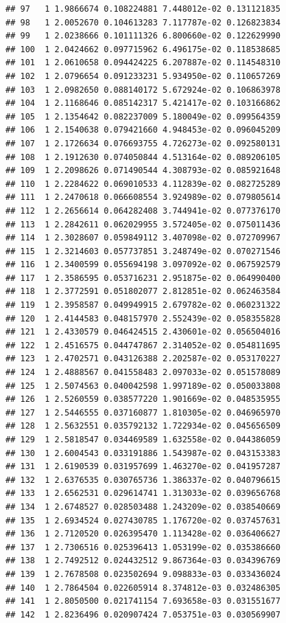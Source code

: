 \documentclass[article]{jss}\usepackage[]{graphicx}\usepackage[]{xcolor}
\makeatletter
\newenvironment{kframe}{%
 \def\at@end@of@kframe{}%
 \ifinner\ifhmode%
  \def\at@end@of@kframe{\end{minipage}}%
  \begin{minipage}{\columnwidth}%
 \fi\fi%
 \def\FrameCommand##1{\hskip\@totalleftmargin \hskip-\fboxsep
 \colorbox{shadecolor}{##1}\hskip-\fboxsep
     \hskip-\linewidth \hskip-\@totalleftmargin \hskip\columnwidth}%
 \MakeFramed {\advance\hsize-\width
   \@totalleftmargin\z@ \linewidth\hsize
   \@setminipage}}%
 {\par\unskip\endMakeFramed%
 \at@end@of@kframe}
\newenvironment{knitrout}{}{} %
\makeatother
\begin{document}
\begin{knitrout}
\begin{kframe}
\begin{verbatim}
## 97   1 1.9866674 0.108224881 7.448012e-02 0.131121835
## 98   1 2.0052670 0.104613283 7.117787e-02 0.126823834
## 99   1 2.0238666 0.101111326 6.800660e-02 0.122629990
## 100  1 2.0424662 0.097715962 6.496175e-02 0.118538685
## 101  1 2.0610658 0.094424225 6.207887e-02 0.114548310
## 102  1 2.0796654 0.091233231 5.934950e-02 0.110657269
## 103  1 2.0982650 0.088140172 5.672924e-02 0.106863978
## 104  1 2.1168646 0.085142317 5.421417e-02 0.103166862
## 105  1 2.1354642 0.082237009 5.180049e-02 0.099564359
## 106  1 2.1540638 0.079421660 4.948453e-02 0.096045209
## 107  1 2.1726634 0.076693755 4.726273e-02 0.092580131
## 108  1 2.1912630 0.074050844 4.513164e-02 0.089206105
## 109  1 2.2098626 0.071490544 4.308793e-02 0.085921648
## 110  1 2.2284622 0.069010533 4.112839e-02 0.082725289
## 111  1 2.2470618 0.066608554 3.924989e-02 0.079805614
## 112  1 2.2656614 0.064282408 3.744941e-02 0.077376170
## 113  1 2.2842611 0.062029955 3.572405e-02 0.075011436
## 114  1 2.3028607 0.059849112 3.407098e-02 0.072709967
## 115  1 2.3214603 0.057737851 3.248749e-02 0.070271546
## 116  1 2.3400599 0.055694198 3.097092e-02 0.067592579
## 117  1 2.3586595 0.053716231 2.951875e-02 0.064990400
## 118  1 2.3772591 0.051802077 2.812851e-02 0.062463584
## 119  1 2.3958587 0.049949915 2.679782e-02 0.060231322
## 120  1 2.4144583 0.048157970 2.552439e-02 0.058355828
## 121  1 2.4330579 0.046424515 2.430601e-02 0.056504016
## 122  1 2.4516575 0.044747867 2.314052e-02 0.054811695
## 123  1 2.4702571 0.043126388 2.202587e-02 0.053170227
## 124  1 2.4888567 0.041558483 2.097033e-02 0.051578089
## 125  1 2.5074563 0.040042598 1.997189e-02 0.050033808
## 126  1 2.5260559 0.038577220 1.901669e-02 0.048535955
## 127  1 2.5446555 0.037160877 1.810305e-02 0.046965970
## 128  1 2.5632551 0.035792132 1.722934e-02 0.045656509
## 129  1 2.5818547 0.034469589 1.632558e-02 0.044386059
## 130  1 2.6004543 0.033191886 1.543987e-02 0.043153383
## 131  1 2.6190539 0.031957699 1.463270e-02 0.041957287
## 132  1 2.6376535 0.030765736 1.386337e-02 0.040796615
## 133  1 2.6562531 0.029614741 1.313033e-02 0.039656768
## 134  1 2.6748527 0.028503488 1.243209e-02 0.038540669
## 135  1 2.6934524 0.027430785 1.176720e-02 0.037457631
## 136  1 2.7120520 0.026395470 1.113428e-02 0.036406627
## 137  1 2.7306516 0.025396413 1.053199e-02 0.035386660
## 138  1 2.7492512 0.024432512 9.867364e-03 0.034396769
## 139  1 2.7678508 0.023502694 9.098833e-03 0.033436024
## 140  1 2.7864504 0.022605914 8.374812e-03 0.032486305
## 141  1 2.8050500 0.021741154 7.693658e-03 0.031551677
## 142  1 2.8236496 0.020907424 7.053751e-03 0.030569907

\end{verbatim}
\end{kframe}
\end{knitrout}
\end{document}
